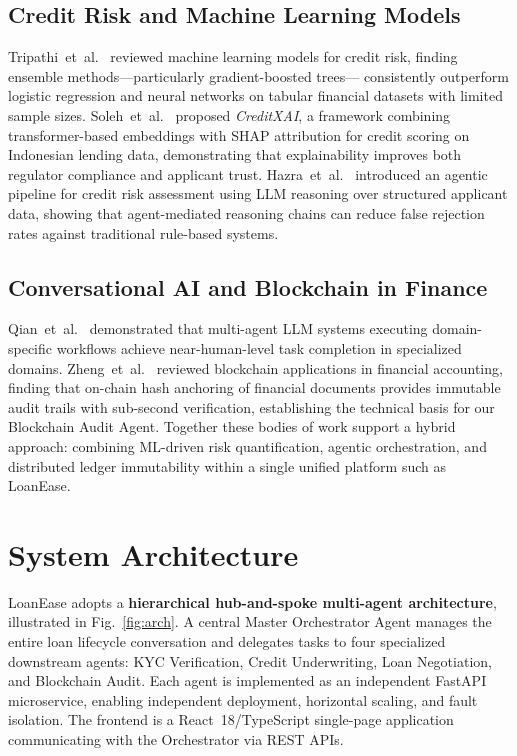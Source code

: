 \documentclass[conference]{IEEEtran}
\begin{document}
\subsection{Credit Risk and Machine Learning Models}

Tripathi~et~al.\ \cite{tripathi2023ml} reviewed machine
learning models for credit risk, finding ensemble
methods---particularly gradient-boosted trees---
consistently outperform logistic regression and neural
networks on tabular financial datasets with limited
sample sizes. Soleh~et~al.\ \cite{soleh2024creditxai}
proposed \textit{CreditXAI}, a framework combining
transformer-based embeddings with SHAP attribution for
credit scoring on Indonesian lending data, demonstrating
that explainability improves both regulator compliance
and applicant trust. Hazra~et~al.\ \cite{hazra2025agentic}
introduced an agentic pipeline for credit risk assessment
using LLM reasoning over structured applicant data,
showing that agent-mediated reasoning chains can reduce
false rejection rates against traditional rule-based
systems.

\subsection{Conversational AI and Blockchain in Finance}

Qian~et~al.\ \cite{qian2024chatdev} demonstrated that
multi-agent LLM systems executing domain-specific
workflows achieve near-human-level task completion in
specialized domains. Zheng~et~al.\ \cite{zheng2024blockchain}
reviewed blockchain applications in financial accounting,
finding that on-chain hash anchoring of financial
documents provides immutable audit trails with sub-second
verification, establishing the technical basis for our
Blockchain Audit Agent. Together these bodies of work
support a hybrid approach: combining ML-driven risk
quantification, agentic orchestration, and distributed
ledger immutability within a single unified platform
such as LoanEase.

\section{System Architecture}

LoanEase adopts a \textbf{hierarchical hub-and-spoke
multi-agent architecture}, illustrated in Fig.~\ref{fig:arch}.
A central Master Orchestrator Agent manages the entire
loan lifecycle conversation and delegates tasks to four
specialized downstream agents: KYC Verification, Credit
Underwriting, Loan Negotiation, and Blockchain Audit.
Each agent is implemented as an independent FastAPI
microservice, enabling independent deployment,
horizontal scaling, and fault isolation. The frontend
is a React~18/TypeScript single-page application
communicating with the Orchestrator via REST APIs.
\end{document}
